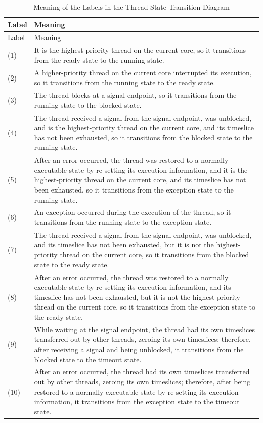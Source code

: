 \begin{xltabular}{\textwidth}{@{}>{\hsize\raggedright\arraybackslash}X>{\hsize\raggedright\arraybackslash}X@{}}
\caption{Meaning of the Labels in the Thread State Transition Diagram}\label{tab:4-7-thread-state-transition-labels}\\
\toprule
Label & Meaning\tabularnewline
\endfirsthead
\toprule
Label & Meaning\tabularnewline
\midrule
\endhead
\bottomrule
\endlastfoot
    (1) & It is the highest-priority thread on the current core, so it transitions from the ready state to the running state.\tabularnewline
    (2) & A higher-priority thread on the current core interrupted its execution, so it transitions from the running state to the ready state.\tabularnewline
    (3) & The thread blocks at a signal endpoint, so it transitions from the running state to the blocked state.\tabularnewline
    (4) & The thread received a signal from the signal endpoint, was unblocked, and is the highest-priority thread on the current core, and its timeslice has not been exhausted, so it transitions from the blocked state to the running state.\tabularnewline
    (5) & After an error occurred, the thread was restored to a normally executable state by re-setting its execution information, and it is the highest-priority thread on the current core, and its timeslice has not been exhausted, so it transitions from the exception state to the running state.\tabularnewline
    (6) & An exception occurred during the execution of the thread, so it transitions from the running state to the exception state.\tabularnewline
    (7) & The thread received a signal from the signal endpoint, was unblocked, and its timeslice has not been exhausted, but it is not the highest-priority thread on the current core, so it transitions from the blocked state to the ready state.\tabularnewline
    (8) & After an error occurred, the thread was restored to a normally executable state by re-setting its execution information, and its timeslice has not been exhausted, but it is not the highest-priority thread on the current core, so it transitions from the exception state to the ready state.\tabularnewline
    (9) & While waiting at the signal endpoint, the thread had its own timeslices transferred out by other threads, zeroing its own timeslices; therefore, after receiving a signal and being unblocked, it transitions from the blocked state to the timeout state.\tabularnewline
    (10) & After an error occurred, the thread had its own timeslices transferred out by other threads, zeroing its own timeslices; therefore, after being restored to a normally executable state by re-setting its execution information, it transitions from the exception state to the timeout state.\tabularnewline

\end{xltabular}
